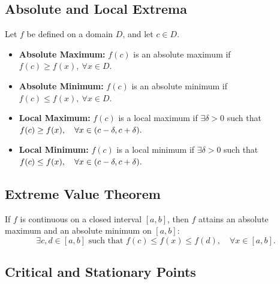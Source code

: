 \documentclass[a4paper,11pt]{article}
\begin{document}


\subsection{Absolute and Local Extrema}

\begin{tcolorbox}
    Let $f$ be defined on a domain $D$, and let $c \in D$.
    \begin{itemize}
        \item \textbf{Absolute Maximum:} $f(c)$ is an absolute maximum if $f(c) \geq f(x),\ \forall x \in D.$
        \item \textbf{Absolute Minimum:} $f(c)$ is an absolute minimum if $f(c) \leq f(x),\ \forall x \in D.$
        \item \textbf{Local Maximum:} $f(c)$ is a local maximum if $\exists \delta > 0$ such that $f(c) \geq f(x),\\ \quad \forall x \in (c - \delta, c + \delta).$
        \item \textbf{Local Minimum:} $f(c)$ is a local minimum if $\exists \delta > 0$ such that $f(c) \leq f(x),\\ \quad \forall x \in (c - \delta, c + \delta).$
    \end{itemize}
\end{tcolorbox}




\subsection{Extreme Value Theorem}

\begin{tcolorbox}
    If $f$ is continuous on a closed interval $[a,b]$, then $f$ attains an absolute maximum and an absolute minimum on $[a,b]$:
    \[
    \exists c,d \in [a,b] \text{ such that } f(c) \leq f(x) \leq f(d),\quad \forall x \in [a,b].
    \]
\end{tcolorbox}




\subsection{Critical and Stationary Points}
\end{document}
